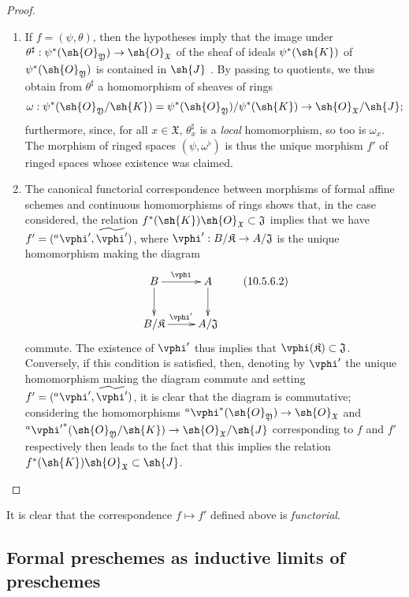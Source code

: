 \begin{proof}
\medskip\noindent
\begin{enumerate}
  \item[\rm{(i)}] If $f=(\psi,\theta)$, then the hypotheses imply that the image under $\theta^\sharp:\psi^*(\sh{O}_\mathfrak{Y})\to\sh{O}_\mathfrak{X}$ of the sheaf of ideals $\psi^*(\sh{K})$ of $\psi^*(\sh{O}_\mathfrak{Y})$ is contained in $\sh{J}$ .
    By passing to quotients, we thus obtain from $\theta^\sharp$ a homomorphism of sheaves of rings
    \[
      \omega:\psi^*(\sh{O}_\mathfrak{Y}/\sh{K})=\psi^*(\sh{O}_\mathfrak{Y})/\psi^*(\sh{K})\to\sh{O}_\mathfrak{X}/\sh{J};
    \]
    furthermore, since, for all $x\in\mathfrak{X}$, $\theta_x^\sharp$ is a \emph{local} homomorphism, so too is $\omega_x$.
    The morphism of ringed spaces $(\psi,\omega^\flat)$ is thus  the unique morphism $f'$ of ringed spaces whose existence was claimed.
  \item[\rm{(ii)}] The canonical functorial correspondence between morphisms of formal affine schemes and continuous homomorphisms of rings  shows that, in the case considered, the relation $f^*(\sh{K})\sh{O}_\mathfrak{X}\subset\mathfrak{J}$ implies that we have $f'=({}^a\vphi',\widetilde{\vphi'})$, where $\vphi':B/\mathfrak{K}\to A/\mathfrak{J}$ is the unique homomorphism making the diagram
    \[
    \label{I.10.5.6.2}
      \xymatrix{
        B\ar[r]^\vphi\ar[d] &
        A\ar[d]\\
        B/\mathfrak{K}\ar[r]^{\vphi'} &
        A/\mathfrak{J}
      }
      \tag{10.5.6.2}
    \]
    commute.
    The existence of $\vphi'$ thus implies that $\vphi(\mathfrak{K})\subset\mathfrak{J}$.
    Conversely, if this condition is satisfied, then, denoting by $\vphi'$ the unique homomorphism making the diagram  commute and setting $f'=({}^a\vphi',\widetilde{\vphi'})$, it is clear that the diagram  is commutative; considering the homomorphisms ${}^a\vphi^*(\sh{O}_\mathfrak{Y})\to\sh{O}_\mathfrak{X}$ and ${}^a{\vphi'}^*(\sh{O}_\mathfrak{Y}/\sh{K})\to\sh{O}_\mathfrak{X}/\sh{J}$ corresponding to $f$ and $f'$ respectively then leads to the fact that this implies the relation $f^*(\sh{K})\sh{O}_\mathfrak{X}\subset\sh{J}$.
\end{enumerate}
\end{proof}

It is clear that the correspondence $f\mapsto f'$ defined above is \emph{functorial}.

\subsection{Formal preschemes as inductive limits of preschemes}
\label{subsection:I.10.6}

